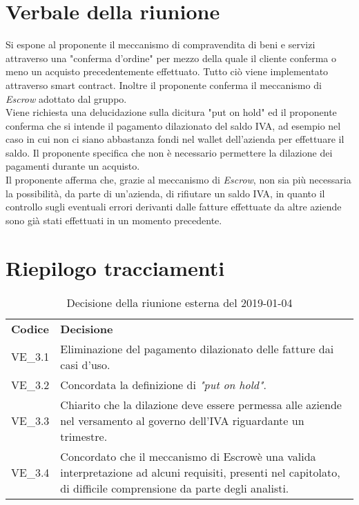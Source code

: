 \section{Verbale della riunione}
Si espone al proponente il meccanismo di compravendita di beni e servizi attraverso
una "conferma d'ordine\glo" per mezzo della quale il cliente conferma o meno un acquisto precedentemente effettuato.
Tutto ciò viene implementato attraverso smart contract\glo{}. Inoltre il proponente
conferma il meccanismo di \textit{Escrow\glo{}} adottato dal gruppo. \\
Viene richiesta una delucidazione sulla dicitura "put on hold" ed il proponente conferma
che si intende il pagamento dilazionato del saldo IVA, ad esempio nel caso in cui non 
ci siano abbastanza fondi nel wallet\glo{} dell'azienda per effettuare il saldo. 
Il proponente specifica che non è necessario permettere la dilazione dei pagamenti durante un acquisto. \\
Il proponente afferma che, grazie al meccanismo di \textit{Escrow\glo{}}, non sia più necessaria la possibilità, da parte di un'azienda, di rifiutare un saldo IVA, in quanto il controllo sugli eventuali errori derivanti dalle fatture effettuate da altre aziende sono già stati effettuati in un momento precedente.

\pagebreak

\section{Riepilogo tracciamenti}
\begin{table}[H]
	
	\begin{longtable}{ >{\centering}p{} >{\centering}p{}}
			
		\rowcolorhead
		\centering \textbf{\color{white}Codice} 
		& \centering \textbf{\color{white}Decisione} 
		
		\tabularnewline 
		VE\_3.1 & Eliminazione del pagamento dilazionato delle fatture dai casi d'uso.
		
		\tabularnewline 
		VE\_3.2 & Concordata la definizione di \textit{"put on hold"}.
		
		\tabularnewline 
		VE\_3.3 & Chiarito che la dilazione deve essere permessa alle aziende nel versamento al governo dell'IVA riguardante un trimestre.
		\tabularnewline 
		VE\_3.4 & Concordato che il meccanismo di Escrow\glosp è una valida interpretazione ad alcuni requisiti, presenti nel capitolato\glo, di difficile comprensione da parte degli analisti.

		
	\end{longtable}
	\caption{Decisione della riunione esterna del 2019-01-04}	

\end{table}

